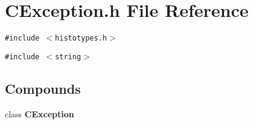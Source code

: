 \section{CException.h File Reference}
\label{CException_8h}
{\tt \#include $<$histotypes.h$>$}\par
{\tt \#include $<$string$>$}\par
\subsection*{Compounds}
\begin{CompactItemize}
\item 
class {\bf CException}
\end{CompactItemize}
